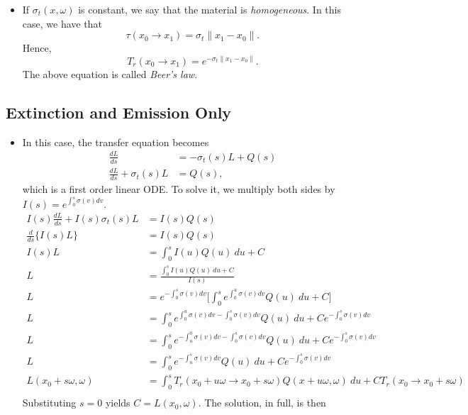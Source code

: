 \documentclass[10pt]{article}
\begin{document}
\begin{itemize}
			\item If $\sigma_t(x,\omega)$ is constant, we say that the material is \emph{homogeneous}. In this case,
				we have that $$\tau (x_0 \rightarrow x_1) = \sigma_t \| x_1 - x_0\|.$$ 
				Hence, $$T_r(x_0 \rightarrow x_1) = e^{-\sigma_t \| x_1 - x_0 \|}.$$
				The above equation is called \emph{Beer's law}.
		\end{itemize}
	
	\subsection{Extinction and Emission Only} %
	\label{sub:extinction_and_emission_only}
	
		\begin{itemize}
			\item In this case, the transfer equation becomes
			\begin{align*}
				\frac{dL}{ds} &= -\sigma_t(s) L + Q(s) \\
				\frac{dL}{ds} + \sigma_t(s)L &=  Q(s),
			\end{align*}
			which is a first order linear ODE. To solve it, we multiply both sides by $I(s) = e^{\int_0^s \sigma(v) dv}$.
			\begin{align*}
				I(s) \frac{dL}{ds} + I(s) \sigma_t(s) L &= I(s) Q(s) \\
				\frac{d}{ds}\Big\{ I(s) L\Big\} &= I(s) Q(s) \\
				I(s) L &= \int_0^s I(u) Q(u)\ du + C \\
				L &= \frac{\int_0^s I(u) Q(u)\ du + C}{I(s)} \\
				L &= e^{-\int_0^s \sigma(v) dv} \Big[ \int_0^s e^{\int_0^u \sigma(v) dv} Q(u)\ du + C \Big] \\
				L &= \int_0^s e^{\int_0^u \sigma(v) dv - \int_0^s \sigma(v) dv} Q(u)\ du + C e^{-\int_0^s \sigma(v) dv} \\
				L &= \int_0^s e^{-\int_u^0 \sigma(v) dv - \int_0^s \sigma(v) dv} Q(u)\ du + C e^{-\int_0^s \sigma(v) dv} \\
				L &= \int_0^s e^{-\int_u^s \sigma(v) dv} Q(u)\ du + C e^{-\int_0^s \sigma(v) dv} \\
				L(x_0 + s\omega, \omega) &= \int_0^s T_r(x_0 + u\omega \rightarrow x_0 + s\omega) Q(x+u\omega, \omega)\ du + C T_r(x_0 \rightarrow x_0 + s\omega) \\
			\end{align*}
			Substituting $s = 0$ yields $C = L(x_0, \omega).$ The solution, in full, is then
			\begin{align*}

\end{align*}
\end{itemize}
\end{document}
